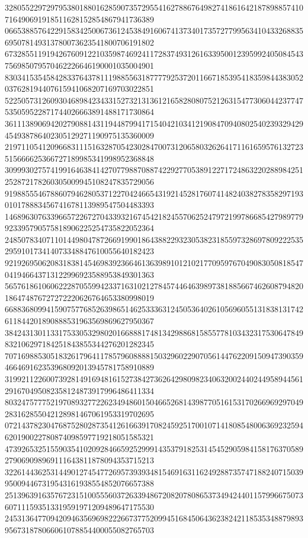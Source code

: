 \begin{DoxyCode}
      328055229729795380188016285907357295541627886764982741861642187898857410716490691918511628152854867941736389
      066538857642291583425006736124538491606741373401735727799563410433268835695078149313780073623541800706191802
      673285511919426760912210359874692411728374931261633950012395992405084543756985079570462226646190001035004901
      830341535458428337643781119885563187777925372011667185395418359844383052037628194407615941068207169703022851
      522505731260930468984234331527321313612165828080752126315477306044237747535059522871744026663891488171730864
      361113890694202790881431194487994171540421034121908470940802540239329429454938786402305129271190975135360009
      219711054120966831115163287054230284700731206580326264171161659576132723515666625366727189985341998952368848
      309993027574199164638414270779887088742292770538912271724863220288984251252872178260305009945108247835729056
      919885554678860794628053712270424665431921452817607414824038278358297193010178883456741678113989547504483393
      146896307633966572267270433932167454218245570625247972199786685427989779923395790575818906225254735822052364
      248507834071101449804787266919901864388229323053823185597328697809222535295910173414073348847610055640182423
      921926950620831838145469839236646136398910121021770959767049083050818547041946643713122996923588953849301363
      565761861060622287055994233716310212784574464639897381885667462608794820186474876727272220626764653380998019
      668836809941590757768526398651462533363124505364026105696055131838131742611844201890888531963569869627950367
      384243130113317533053298020166888174813429886815855778103432317530647849832106297184251843855344276201282345
      707169885305183261796411785796088881503296022907056144762209150947390359466469162353968092013945781758910889
      319921122600739281491694816152738427362642980982340632002440244958944561291670495082358124873917996486411334
      803247577752197089327722623494860150466526814398770516153170266969297049283162855042128981467061953319702695
      072143782304768752802873541261663917082459251700107141808548006369232594620190022780874098597719218051585321
      473926532515590354102092846659252999143537918253145452905984158176370589279069098969111643811878094353715213
      322614436253144901274547726957393934815469163116249288735747188240715039950094467319543161938554852076657388
      251396391635767231510055560372633948672082078086537349424401157996675073607111593513319591971209489647175530
      245313647709420946356969822266737752099451684506436238242118535348879893956731878066061078854400055082765703

\end{DoxyCode}
